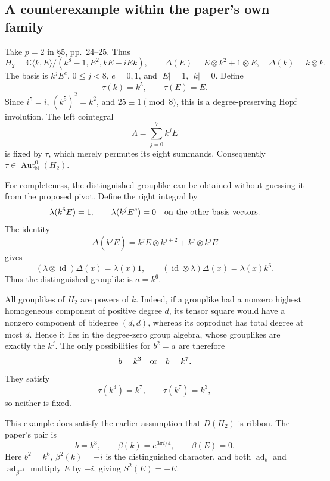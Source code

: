 \documentclass[10pt]{article}
\begin{document}
\subsection*{A counterexample within the paper’s own family}
Take \(p=2\) in §5, pp. 24–25. Thus \[H_2=\mathbb C\langle k,E\rangle/(k^8-1,E^2,kE-iEk),\qquad
 \Delta(E)=E\otimes k^2+1\otimes E,\quad \Delta(k)=k\otimes k.
 \tag{1}\] The basis is \(k^jE^e\), \(0\le j<8\), \(e=0,1\), and \(|E|=1\), \(|k|=0\). Define \[\tau(k)=k^5,\qquad \tau(E)=E.                 \tag{2}\] Since \(i^5=i\), \((k^5)^2=k^2\), and \(25\equiv1\pmod8\), this is a degree-preserving Hopf involution. The left cointegral \[\Lambda=\sum_{j=0}^7 k^j E\] is fixed by \(\tau\), which merely permutes its eight summands. Consequently \(\tau\in\operatorname{Aut}^0_\mathbb N(H_2)\).\par
For completeness, the distinguished grouplike can be obtained without guessing it from the proposed pivot. Define the right integral by \[\lambda(k^6E)=1,\qquad
 \lambda(k^jE^e)=0\quad\hbox{on the other basis vectors}.\] The identity \[\Delta(k^jE)=k^jE\otimes k^{j+2}+k^j\otimes k^jE\] gives \[(\lambda\otimes\operatorname{id})\Delta(x)=\lambda(x)1,\qquad
 (\operatorname{id}\otimes\lambda)\Delta(x)=\lambda(x)k^6.\] Thus the distinguished grouplike is \(a=k^6\).\par
All grouplikes of \(H_2\) are powers of \(k\). Indeed, if a grouplike had a nonzero highest homogeneous component of positive degree \(d\), its tensor square would have a nonzero component of bidegree \((d,d)\), whereas its coproduct has total degree at most \(d\). Hence it lies in the degree-zero group algebra, whose grouplikes are exactly the \(k^j\). The only possibilities for \(b^2=a\) are therefore \[b=k^3\quad\hbox{or}\quad b=k^7.\] They satisfy \[\tau(k^3)=k^7,\qquad \tau(k^7)=k^3,      \tag{3}\] so neither is fixed.\par
This example does satisfy the earlier assumption that \(D(H_2)\) is ribbon. The paper’s pair is \[b=k^3,\qquad \beta(k)=e^{3\pi i/4},\qquad\beta(E)=0.\] Here \(b^2=k^6\), \(\beta^2(k)=-i\) is the distinguished character, and both \(\operatorname{ad}_b\) and \(\operatorname{ad}_{\beta^{-1}}\) multiply \(E\) by \(-i\), giving \(S^2(E)=-E\).\par
\end{document}
